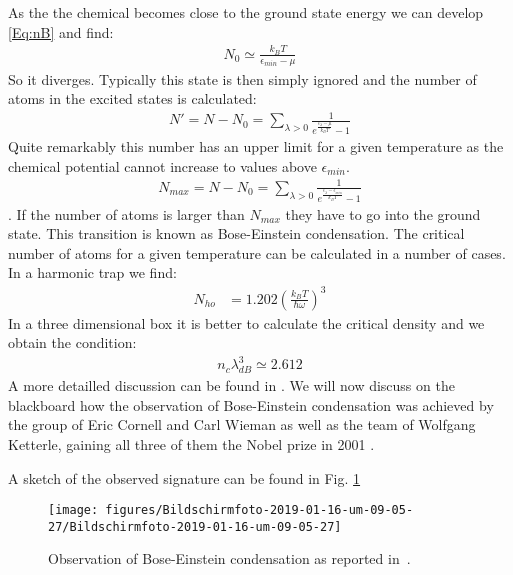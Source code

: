 \documentclass[10pt]{article}
\let\cite\citep
\providecommand\citep{\cite}
\begin{document}
As the the chemical becomes close to the ground state energy we can develop \eqref{Eq:nB} and find:
\begin{align}
N_0 \simeq \frac{k_B T}{\epsilon_{min}-\mu}
\end{align}
So it diverges. Typically this state is then simply ignored and the number of atoms in the excited states is calculated:
\begin{align}
N' = N - N_0 = \sum_{\lambda>0} \frac{1}{e^{\frac{\epsilon_\lambda - \mu}{k_BT}}-1}
\end{align}
Quite remarkably this number has an upper limit for a given temperature as the chemical potential cannot increase to values above $\epsilon_{min}$.
\begin{align}
N_{max} = N - N_0 = \sum_{\lambda>0} \frac{1}{e^{\frac{\epsilon_\lambda - \epsilon_{min}}{k_BT}}-1}
\end{align}
. If the number of atoms is larger than $N_{max}$ they have to go into the ground state. This transition is known as Bose-Einstein condensation. The critical number of atoms for a given temperature can be calculated in a number of cases. In a harmonic trap we find:
\begin{align}
N_{ho} &= 1.202 \left(\frac{k_B T}{\hbar \omega}\right)^3 
\end{align}
In a three dimensional box it is better to calculate the critical density and we obtain the condition:
\begin{align}
n_c\lambda_{dB}^3\simeq 2.612
\end{align}
A more detailled discussion can be found in \cite{Dalfovo_1999, Leggett_2001}. We will now discuss on the blackboard how the observation of Bose-Einstein condensation was achieved by the group of Eric Cornell and Carl Wieman as well as the team of Wolfgang Ketterle, gaining all three of them the Nobel prize in 2001 \cite{Cornell_2002,Ketterle_2002}. 

A sketch of the observed signature can be found in Fig. \ref{460581}
\begin{figure}[h!]
\begin{center}
\texttt{[image: figures/Bildschirmfoto-2019-01-16-um-09-05-27/Bildschirmfoto-2019-01-16-um-09-05-27]}
\caption{{Observation of Bose-Einstein condensation as reported
in~\protect\cite{Anderson_1995}.
{\label{460581}}%
}}
\end{center}
\end{figure}
\end{document}
